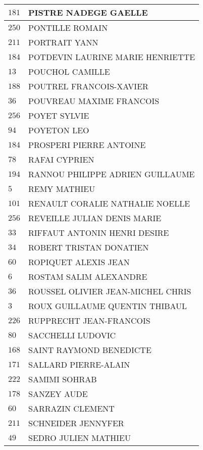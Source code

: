 \begin{xltabular}{\linewidth}{|l|X|}
    $181$ & PISTRE NADEGE GAELLE \\
    \hline
    $250$ & PONTILLE ROMAIN \\
    \hline
    $211$ & PORTRAIT YANN \\
    \hline
    $184$ & POTDEVIN LAURINE MARIE HENRIETTE \\
    \hline
    $13$ & POUCHOL CAMILLE \\
    \hline
    $188$ & POUTREL FRANCOIS-XAVIER \\
    \hline
    $36$ & POUVREAU MAXIME FRANCOIS \\
    \hline
    $256$ & POYET SYLVIE \\
    \hline
    $94$ & POYETON LEO \\
    \hline
    $184$ & PROSPERI PIERRE ANTOINE \\
    \hline
    $78$ & RAFAI CYPRIEN \\
    \hline
    $194$ & RANNOU PHILIPPE ADRIEN GUILLAUME \\
    \hline
    $5$ & REMY MATHIEU \\
    \hline
    $101$ & RENAULT CORALIE NATHALIE NOELLE \\
    \hline
    $256$ & REVEILLE JULIAN DENIS MARIE \\
    \hline
    $33$ & RIFFAUT ANTONIN HENRI DESIRE \\
    \hline
    $34$ & ROBERT TRISTAN DONATIEN \\
    \hline
    $60$ & ROPIQUET ALEXIS JEAN \\
    \hline
    $6$ & ROSTAM SALIM ALEXANDRE \\
    \hline
    $36$ & ROUSSEL OLIVIER JEAN-MICHEL CHRIS \\
    \hline
    $3$ & ROUX GUILLAUME QUENTIN THIBAUL \\
    \hline
    $226$ & RUPPRECHT JEAN-FRANCOIS \\
    \hline
    $80$ & SACCHELLI LUDOVIC \\
    \hline
    $168$ & SAINT RAYMOND BENEDICTE \\
    \hline
    $171$ & SALLARD PIERRE-ALAIN \\
    \hline
    $222$ & SAMIMI SOHRAB \\
    \hline
    $178$ & SANZEY AUDE \\
    \hline
    $60$ & SARRAZIN CLEMENT \\
    \hline
    $211$ & SCHNEIDER JENNYFER \\
    \hline
    $49$ & SEDRO JULIEN MATHIEU \\

\end{xltabular}
